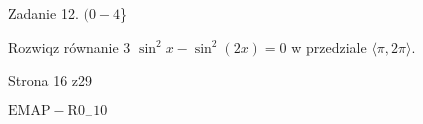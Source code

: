 \documentclass[a4paper,12pt]{article}
\begin{document}
Zadanie 12. $(0-4$\}

Rozwiqz równanie 3 $\sin^{2}x-\sin^{2}(2x)=0$ w przedziale $\langle\pi, 2\pi\rangle.$

Strona 16 z29

$\mathrm{E}\mathrm{M}\mathrm{A}\mathrm{P}-\mathrm{R}0_{-}10$
\end{document}
